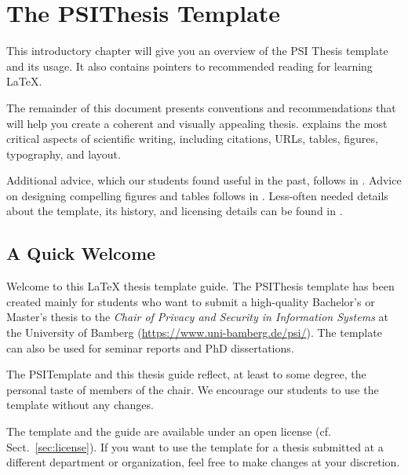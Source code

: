 \chapter{The PSIThesis Template} %

\label{Chapter1} %


This introductory chapter will give you an overview of the PSI Thesis template and its usage.
It also contains pointers to recommended reading for learning \LaTeX{}.

The remainder of this document presents conventions and recommendations that will help you create a coherent and visually appealing thesis.  explains the most critical aspects of scientific writing, including citations, URLs, tables, figures, typography, and layout.

Additional advice, which our students found useful in the past, follows in . Advice on designing compelling figures and tables follows in . Less-often needed details about the template, its history, and licensing details can be found in .

\section{A Quick Welcome}

Welcome to this LaTeX thesis template guide.%
The PSIThesis template has been created mainly for students who want to submit a high-quality Bachelor's or Master's thesis to the \emph{Chair of Privacy and Security in Information Systems} at the University of Bamberg (\url{https://www.uni-bamberg.de/psi/}). The template can also be used for seminar reports and PhD dissertations.

The PSITemplate and this thesis guide reflect, at least to some degree, the personal taste of members of the chair.
We encourage our students to use the template without any changes.

The template and the guide are available under an open license (cf. Sect.~\ref{sec:license}). If you want to use the template for a thesis submitted at a different department or organization, feel free to make changes at your discretion.

